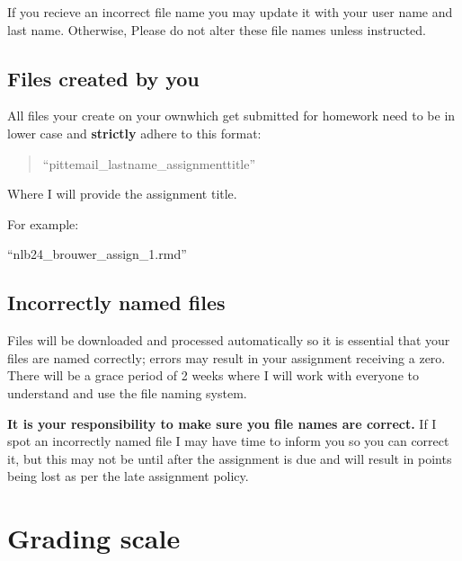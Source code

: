 \documentclass[
]{book}
\begin{document}
If you recieve an incorrect file name you may update it with your user name and last name. Otherwise, Please do not alter these file names unless instructed.

\hypertarget{files-created-by-you}{%
\section{Files created by you}\label{files-created-by-you}}

All files your create on your ownwhich get submitted for homework need to be in lower case and \textbf{strictly} adhere to this format:

\begin{quote}
``pittemail\_lastname\_assignmenttitle''
\end{quote}

Where I will provide the assignment title.

For example:

``nlb24\_brouwer\_assign\_1.rmd''

\hypertarget{incorrectly-named-files}{%
\section{Incorrectly named files}\label{incorrectly-named-files}}

Files will be downloaded and processed automatically so it is essential that your files are named correctly; errors may result in your assignment receiving a zero. There will be a grace period of 2 weeks where I will work with everyone to understand and use the file naming system.

\textbf{It is your responsibility to make sure you file names are correct.} If I spot an incorrectly named file I may have time to inform you so you can correct it, but this may not be until after the assignment is due and will result in points being lost as per the late assignment policy.

\hypertarget{grading-scale}{%
\chapter{Grading scale}\label{grading-scale}}
\end{document}

